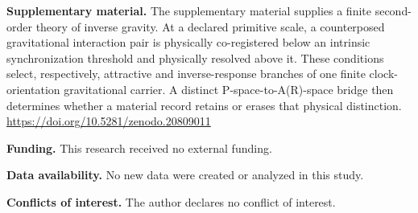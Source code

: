 \documentclass[10pt,twoside,a5paper]{article}
\theoremstyle{definition}
\begin{document}
\vspace{4pt}
\noindent\textbf{Supplementary material.} The supplementary material supplies a finite second-order theory of inverse gravity. At a declared primitive scale, a counterposed gravitational interaction pair is physically co-registered below an intrinsic synchronization threshold and physically resolved above it. These conditions select, respectively, attractive and inverse-response branches of one finite clock-orientation gravitational carrier. A distinct P-space-to-A(R)-space bridge then determines whether a material record retains or erases that physical distinction.
\url{https://doi.org/10.5281/zenodo.20809011}

\noindent\textbf{Funding.} This research received no external funding.

\noindent\textbf{Data availability.} No new data were created or analyzed in this study.

\noindent\textbf{Conflicts of interest.} The author declares no conflict of interest.
\end{document}
